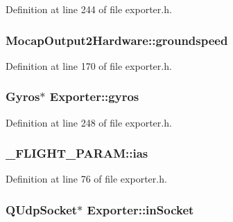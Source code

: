 Definition at line 244 of file exporter.\-h.

\hypertarget{group___mo_cap_plugin_gab0735b3db4133ae25e01a4ee6dc3347f}{
\subsubsection[{groundspeed}]{ Mocap\-Output2\-Hardware\-::groundspeed}}\label{group___mo_cap_plugin_gab0735b3db4133ae25e01a4ee6dc3347f}


Definition at line 170 of file exporter.\-h.

\hypertarget{group___mo_cap_plugin_ga2b6042b4adabe6985d92cc22f33cfc9a}{
\subsubsection[{gyros}]{\setlength{\rightskip}{0pt plus 5cm}Gyros$\ast$ Exporter\-::gyros\hspace{0.3cm}{\ttfamily [protected]}}}\label{group___mo_cap_plugin_ga2b6042b4adabe6985d92cc22f33cfc9a}


Definition at line 248 of file exporter.\-h.

\hypertarget{group___mo_cap_plugin_ga30e6260b59e9997c3b1bec5bc9347ec3}{
\subsubsection[{ias}]{ \-\_\-\-F\-L\-I\-G\-H\-T\-\_\-\-P\-A\-R\-A\-M\-::ias}}\label{group___mo_cap_plugin_ga30e6260b59e9997c3b1bec5bc9347ec3}


Definition at line 76 of file exporter.\-h.

\hypertarget{group___mo_cap_plugin_ga01c0037d3abe6f3cfc9521e865cbe65f}{
\subsubsection[{in\-Socket}]{\setlength{\rightskip}{0pt plus 5cm}Q\-Udp\-Socket$\ast$ Exporter\-::in\-Socket\hspace{0.3cm}{\ttfamily [protected]}}}\label{group___mo_cap_plugin_ga01c0037d3abe6f3cfc9521e865cbe65f}


